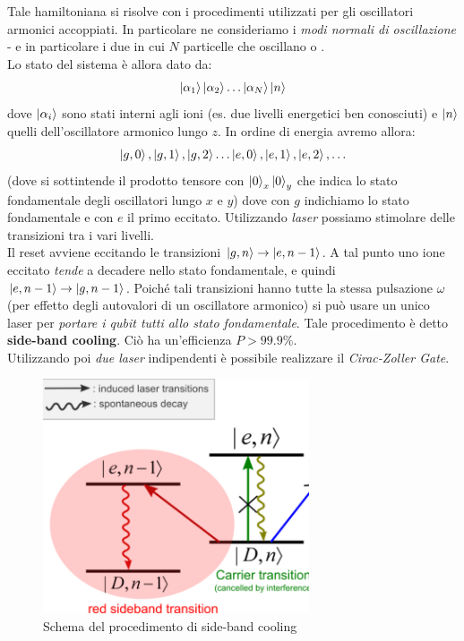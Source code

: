 \documentclass[../../InformazioneQuantistica.tex]{subfiles}
\begin{document}
Tale hamiltoniana si risolve con i procedimenti utilizzati per gli oscillatori armonici accoppiati. In particolare ne consideriamo i \textit{modi normali di oscillazione} - e in particolare i due in cui $N$ particelle che oscillano  o .\\
Lo stato del sistema è allora dato da:
\begin{align*}
\Ket{\alpha_1}\Ket{\alpha_2} \dots \Ket{\alpha_N} \Ket{n}
\end{align*}
dove $\Ket{\alpha_i}$ sono stati interni agli ioni (es. due livelli energetici ben conosciuti) e $\Ket{n}$ quelli dell'oscillatore armonico lungo $z$. In ordine di energia avremo allora:
\begin{align*}
\Ket{g,0},\Ket{g,1},\Ket{g,2} \dots \Ket{e,0},\Ket{e,1},\Ket{e,2},\dots
\end{align*}
(dove si sottintende il prodotto tensore con $\Ket{0}_x\Ket{0}_y$ che indica lo stato fondamentale degli oscillatori lungo $x$ e $y$)
dove con $g$ indichiamo lo stato fondamentale e con $e$ il primo eccitato. Utilizzando \textit{laser} possiamo stimolare delle transizioni tra i vari livelli.\\
Il reset avviene eccitando le transizioni $\Ket{g,n}\to \Ket{e,n-1}$. A tal punto uno ione eccitato \textit{tende} a decadere nello stato fondamentale, e quindi $\Ket{e,n-1}\to \Ket{g,n-1}$. Poiché tali transizioni hanno tutte la stessa pulsazione $\omega$ (per effetto degli autovalori di un oscillatore armonico) si può usare un unico laser per \textit{portare i qubit tutti allo stato fondamentale}. Tale procedimento è detto \textbf{side-band cooling}. Ciò ha un'efficienza $P>99.9\%$.\\
Utilizzando poi \textit{due laser} indipendenti è possibile realizzare il \textit{Cirac-Zoller Gate}. 

\begin{figure}[H]
\centering
\includegraphics[width=0.7\textwidth]{Immagini/12_6/sideband.PNG}
\caption{Schema del procedimento di side-band cooling\label{fig:sideband-cooling}}
\end{figure}
\end{document}
